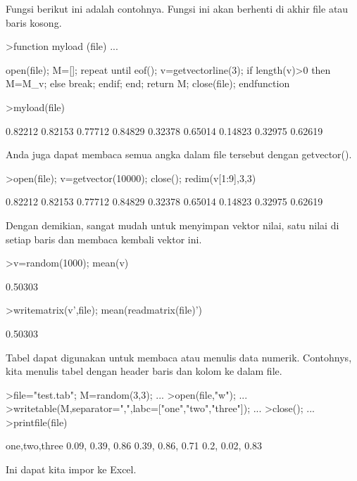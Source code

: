 \documentclass{article}
\begin{document}
\begin{eulernotebook}
\begin{eulercomment}
Fungsi berikut ini adalah contohnya. Fungsi ini akan berhenti di akhir
file atau baris kosong.
\end{eulercomment}
\begin{eulerprompt}
>function myload (file) ...
\end{eulerprompt}
\begin{eulerudf}
  open(file);
  M=[];
  repeat
     until eof();
     v=getvectorline(3);
     if length(v)>0 then M=M_v; else break; endif;
  end;
  return M;
  close(file);
  endfunction
\end{eulerudf}
\begin{eulerprompt}
>myload(file)
\end{eulerprompt}
\begin{euleroutput}
    0.82212   0.82153   0.77712 
    0.84829   0.32378   0.65014 
    0.14823   0.32975   0.62619 
\end{euleroutput}
\begin{eulercomment}
Anda juga dapat membaca semua angka dalam file tersebut dengan
getvector().
\end{eulercomment}
\begin{eulerprompt}
>open(file); v=getvector(10000); close(); redim(v[1:9],3,3)
\end{eulerprompt}
\begin{euleroutput}
    0.82212   0.82153   0.77712 
    0.84829   0.32378   0.65014 
    0.14823   0.32975   0.62619 
\end{euleroutput}
\begin{eulercomment}
Dengan demikian, sangat mudah untuk menyimpan vektor nilai, satu nilai
di setiap baris dan membaca kembali vektor ini.
\end{eulercomment}
\begin{eulerprompt}
>v=random(1000); mean(v)
\end{eulerprompt}
\begin{euleroutput}
  0.50303
\end{euleroutput}
\begin{eulerprompt}
>writematrix(v',file); mean(readmatrix(file)')
\end{eulerprompt}
\begin{euleroutput}
  0.50303
\end{euleroutput}
\begin{eulercomment}
Tabel dapat digunakan untuk membaca atau menulis data numerik.
Contohnys, kita menulis tabel dengan header baris dan kolom ke dalam
file.
\end{eulercomment}
\begin{eulerprompt}
>file="test.tab"; M=random(3,3);  ...
>open(file,"w");  ...
>writetable(M,separator=",",labc=["one","two","three"]);  ...
>close(); ...
>printfile(file)
\end{eulerprompt}
\begin{euleroutput}
  one,two,three
        0.09,      0.39,      0.86
        0.39,      0.86,      0.71
         0.2,      0.02,      0.83
\end{euleroutput}
\begin{eulercomment}
Ini dapat kita impor ke Excel.


\end{eulercomment}
\end{eulernotebook}
\end{document}
